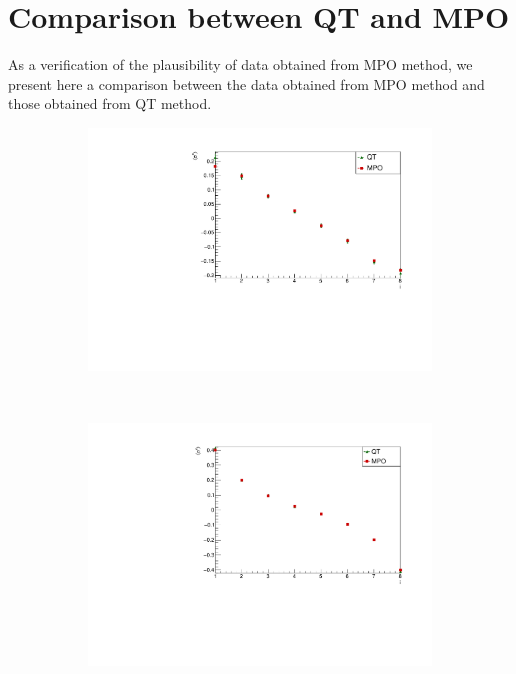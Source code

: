 \section{Comparison between QT and MPO}
As a verification of the plausibility of data obtained from MPO method, we present here a comparison between the data obtained from MPO method and those obtained from QT method.

\begin{figure}
    \centering
        \begin{subfigure}{\columnwidth}
        \centering
        \includegraphics[scale=0.5]{Figures/LMComparison_8sJ10505.pdf}
        \label{fig:LMComparison_8sJ10505}
        \end{subfigure}\\
        \begin{subfigure}{\columnwidth}
        \centering
        \includegraphics[scale=0.5]{Figures/LMComparison_8sJ1051.pdf}

\end{subfigure}
\end{figure}
